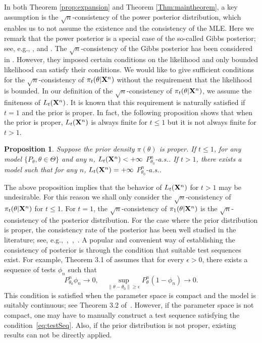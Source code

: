 \documentclass[11pt]{article}
\theoremstyle{plain}
\newtheorem{proposition}{\quad\quad Proposition}
\theoremstyle{definition}
\theoremstyle{remark}
\begin{document}
In both Theorem \ref{prop:expansion} and Theorem \ref{Thm:maintheorem},
a key assumption is the $\sqrt{n}$-consistency of the power posterior distribution, which enables us to not assume the existence and the consistency of the MLE.
Here we remark that the power posterior is a special case of the so-called Gibbs posterior; see, e.g., \cite{Chernozhukov2003}, \cite{Jiang2008} and \cite{Alquier2016}.
The $\sqrt{n}$-consistency of the Gibbs posterior has been considered in \cite{Chernozhukov2003}.
However, they imposed certain conditions on the likelihood and only bounded likelihood can satisfy their conditions.
We would like to give sufficient conditions for the $\sqrt{n}$-consistency of $\pi_t(\theta|\mathbf{X}^{n})$ without the requirement that the likelihood is bounded.
In our definition of the $\sqrt{n}$-consistency of $\pi_t(\theta| \mathbf{X}^n)$, we assume the finiteness of $L_t(\mathbf{X}^n)$.
It is known that this requirement is naturally satisfied if $t=1$ and the prior is proper.
In fact, the following proposition shows that when the prior is proper, $L_t(\mathbf{X}^n)$ is always finite for $t\leq 1$ but it is not always finite for $t>1$.
\begin{proposition}
    Suppose the prior density $\pi(\theta)$ is proper.
    If $t\leq 1$, for any model $\{P_{\theta}, \theta \in \Theta \}$ and any $n$, $L_t(\mathbf{X}^{n})< +\infty$ $P_{\theta_0}^n$-a.s..
    If $t> 1$, there exists a model such that for any $n$, $L_t(\mathbf{X}^{n}) = +\infty$ $P_{\theta_0}^n$-a.s..
    \label{exprop}
\end{proposition}
The above proposition implies that the behavior of $L_t(\mathbf{X}^{n})$ for $t>1$ may be undesirable.
For this reason we shall only consider the $\sqrt n$-consistency of $\pi_t(\theta | \mathbf{X}^{n})$ for $t\leq 1$.
For $t=1$, the $\sqrt{n}$-consistency of $\pi_1(\theta | \mathbf{X}^{n})$ is the $\sqrt{n}$-consistency of the posterior distribution.
For the case where the prior distribution is proper,
the consistency rate of the posterior has been well studied in the literature; see, e.g.,~\cite{ghosal2000},~\cite{Shen2001Rates},~\cite{vaart2007convergence}.
A popular and convenient way of establishing the consistency of posterior is through the condition that suitable test sequences exist.
For example, Theorem 3.1 of \cite{Kleijn2012The} assumes that for every $\epsilon>0$, there exists a sequence of tests $\phi_n$ such that
\begin{equation}\label{eq:testSeq}
    P_{\theta_0}^n\phi_n\to 0,\quad \sup_{\|\theta-\theta_0\|\geq \epsilon} P_\theta^n(1-\phi_n)\to 0.
\end{equation}
This condition is satisfied when the parameter space is compact and the model is suitably continuous; see Theorem 3.2 of~\cite{Kleijn2012The}.
However, if the parameter space is not compact, one may have to manually construct a test sequence satisfying the condition~\eqref{eq:testSeq}.
Also, if the prior distribution is not proper, existing results can not be directly applied.
\end{document}
